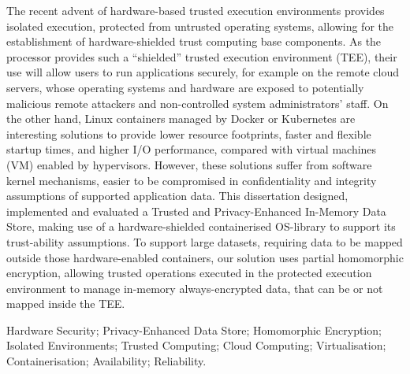 The recent advent of hardware-based trusted execution environments provides isolated execution, protected from untrusted operating systems, allowing for the establishment of hardware-shielded trust computing base components. As the processor provides such a “shielded” trusted execution environment (TEE), their use will allow users to run applications securely, for example on the remote cloud servers, whose operating systems and hardware are exposed to potentially malicious remote attackers and non-controlled system administrators’ staff. On the other hand, Linux containers managed by Docker or Kubernetes are interesting solutions to provide lower resource footprints, faster and flexible startup times, and higher I/O performance, compared with virtual machines (VM) enabled by hypervisors. However, these solutions suffer from software kernel mechanisms, easier to be compromised in confidentiality and integrity assumptions of supported application data.
This dissertation designed, implemented and evaluated a Trusted and Privacy-Enhanced In-Memory Data Store, making use of a hardware-shielded containerised OS-library to support its trust-ability assumptions. To support large datasets, requiring data to be mapped outside those hardware-enabled containers, our solution uses partial homomorphic encryption, allowing trusted operations executed in the protected execution environment to manage in-memory always-encrypted data, that can be or not mapped inside the TEE.

\begin{keywords}
Hardware Security; Privacy-Enhanced Data Store; Homomorphic Encryption; Isolated Environments; Trusted Computing; Cloud Computing; Virtualisation; Containerisation; Availability; Reliability.
\end{keywords} 
